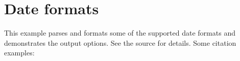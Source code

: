 \documentclass[a4paper]{article}
\begin{document}
\section*{Date formats}

This example parses and formats some of the supported date formats and
demonstrates the output options. See the source for details. Some citation examples:\\
\cite{date1,date2,date3,date4,date5,date6}

\printbibliography[env=simple,title={Examples}]
\end{document}
